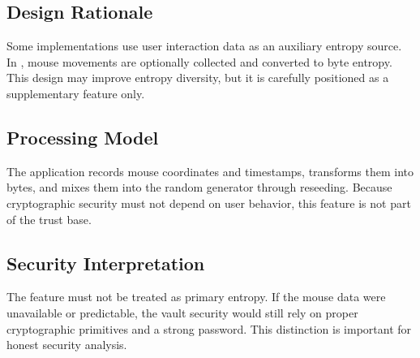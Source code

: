 \subsection{Design Rationale}
Some implementations use user interaction data as an auxiliary entropy source. In \projname{}, mouse movements are optionally collected and converted to byte entropy. This design may improve entropy diversity, but it is carefully positioned as a supplementary feature only.

\subsection{Processing Model}
The application records mouse coordinates and timestamps, transforms them into bytes, and mixes them into the random generator through reseeding. Because cryptographic security must not depend on user behavior, this feature is not part of the trust base.

\subsection{Security Interpretation}
The feature must not be treated as primary entropy. If the mouse data were unavailable or predictable, the vault security would still rely on proper cryptographic primitives and a strong password. This distinction is important for honest security analysis.
